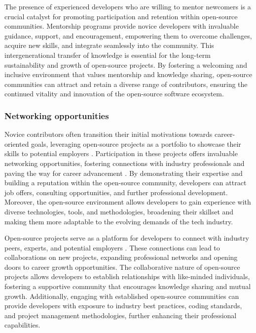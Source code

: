 The presence of experienced developers who are willing to mentor newcomers is a crucial catalyst for promoting participation and retention within open-source communities. Mentorship programs provide novice developers with invaluable guidance, support, and encouragement, empowering them to overcome challenges, acquire new skills, and integrate seamlessly into the community. This intergenerational transfer of knowledge is essential for the long-term sustainability and growth of open-source projects. By fostering a welcoming and inclusive environment that values mentorship and knowledge sharing, open-source communities can attract and retain a diverse range of contributors, ensuring the continued vitality and innovation of the open-source software ecosystem.




\subsubsection{Networking opportunities}
Novice contributors often transition their initial motivations towards career-oriented goals, leveraging open-source projects as a portfolio to showcase their skills to potential employers \cite{05bitzer2007intrinsic,11gerosa2021shifting}. Participation in these projects offers invaluable networking opportunities, fostering connections with industry professionals and paving the way for career advancement \cite{10wu2007empirical,11gerosa2021shifting,13li2012leadership}. By demonstrating their expertise and building a reputation within the open-source community, developers can attract job offers, consulting opportunities, and further professional development. Moreover, the open-source environment allows developers to gain experience with diverse technologies, tools, and methodologies, broadening their skillset and making them more adaptable to the evolving demands of the tech industry.

Open-source projects serve as a platform for developers to connect with industry peers, experts, and potential employers \cite{10wu2007empirical,11gerosa2021shifting,13li2012leadership}. These connections can lead to collaborations on new projects, expanding professional networks and opening doors to career growth opportunities. The collaborative nature of open-source projects allows developers to establish relationships with like-minded individuals, fostering a supportive community that encourages knowledge sharing and mutual growth.  Additionally, engaging with established open-source communities can provide developers with exposure to industry best practices, coding standards, and project management methodologies, further enhancing their professional capabilities.

